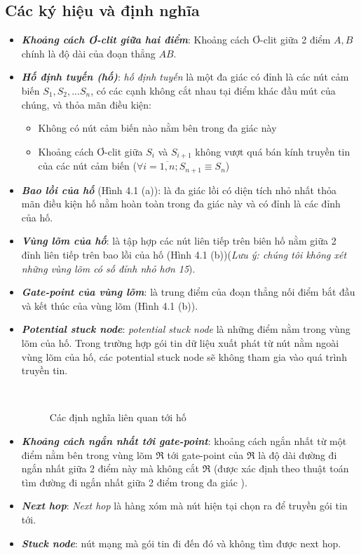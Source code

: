 \documentclass[12pt]{report}
\begin{document}
\subsection{Các ký hiệu và định nghĩa}
\label{sec:4.1.2}
\begin{itemize}
\item \textbf{\textit{Khoảng cách Ơ-clit giữa hai điểm}}: Khoảng cách Ơ-clit giữa 2 điểm $A, B$ chính là độ dài của đoạn thẳng $AB$.
\item \textbf{\textit{Hố định tuyến (hố)}}: \textit{hố định tuyến} là một đa giác có đỉnh là các nút cảm biến $S_{1}, S_{2},... S_{n}$, có các cạnh không cắt nhau tại điểm khác đầu mút của chúng, và thỏa mãn điều kiện:
\begin{itemize}
\item Không có nút cảm biến nào nằm bên trong đa giác này
\item Khoảng cách Ơ-clit giữa $S_{i}$ và $S_{i+1}$ không vượt quá bán kính truyền tin của các nút cảm biến ($\forall i = \overline{1,n}; S_{n+1} \equiv S_{n}$)
\end{itemize}
\item \textbf{\textit{Bao lồi của hố}} (Hình 4.1 (a)): là đa giác lồi có diện tích nhỏ nhất thỏa mãn điều kiện hố nằm hoàn toàn trong đa giác này và có đỉnh là các đỉnh của hố.
\item \textbf{\textit{Vùng lõm của hố}}: là tập hợp các nút liên tiếp trên biên hố nằm giữa 2 đỉnh liên tiếp trên bao lồi của hố (Hình 4.1 (b))(\textit{Lưu ý: chúng tôi không xét những vùng lõm có số đỉnh nhỏ hơn 15}). 
\item \textbf{\textit{Gate-point của vùng lõm}}: là trung điểm của đoạn thẳng nối điểm bắt đầu và kết thúc của vùng lõm (Hình 4.1 (b)).
\item \textbf{\textit{Potential stuck node}}: \textit{potential stuck node} là những điểm nằm trong vùng lõm của hố. Trong trường hợp gói tin dữ liệu xuất phát từ nút nằm ngoài vùng lõm của hố, các potential stuck node sẽ không tham gia vào quá trình truyền tin.
\begin{figure}[H]
\centering
{}
\qquad
{} \\
\caption{Các định nghĩa liên quan tới hố}
\label{fig:globfig}
\end{figure}
\item \textbf{\textit{Khoảng cách ngắn nhất tới gate-point}}: khoảng cách ngắn nhất từ một điểm nằm bên trong vùng lõm $\Re$ tới gate-point của $\Re$ là độ dài đường đi ngắn nhất giữa 2 điểm này mà không cắt $\Re$ (được xác định theo thuật toán tìm đường đi ngắn nhất giữa 2 điểm trong đa giác \cite{shortestpath}). 
\item \textbf{\textit{Next hop}}: \textit{Next hop} là hàng xóm mà nút hiện tại chọn ra để truyền gói tin tới.
\item \textbf{\textit{Stuck node}}: nút mạng mà gói tin đi đến đó và không tìm được next hop.
\end{itemize}
\end{document}
